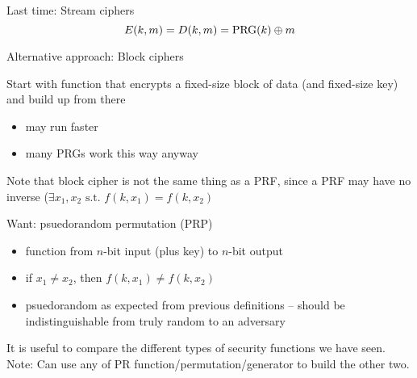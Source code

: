 

Last time: Stream ciphers
    $$E(k,m) = D(k, m) = \text{PRG}(k) \oplus m$$

Alternative approach: Block ciphers

Start with function that encrypts a fixed-size block of data (and fixed-size
        key) and build up from there
\begin{itemize}
    \item may run faster
    \item many PRGs work this way anyway
\end{itemize}

Note that block cipher is not the same thing as a PRF, since a PRF may have no
    inverse ($\exists x_1, x_2 \text{ s.t. } f(k,x_1) = f(k,x_2)$

Want: psuedorandom permutation (PRP)
\begin{itemize}
    \item function from $n$-bit input (plus key) to $n$-bit output
    \item if $x_1 \neq x_2$, then $f(k, x_1) \neq f(k, x_2)$
    \item psuedorandom as expected from previous definitions -- should be
        indistinguishable from truly random to an adversary
\end{itemize}

It is useful to compare the different types of security functions we have
seen. Note: Can use any of PR function/permutation/generator to build
the other two.

